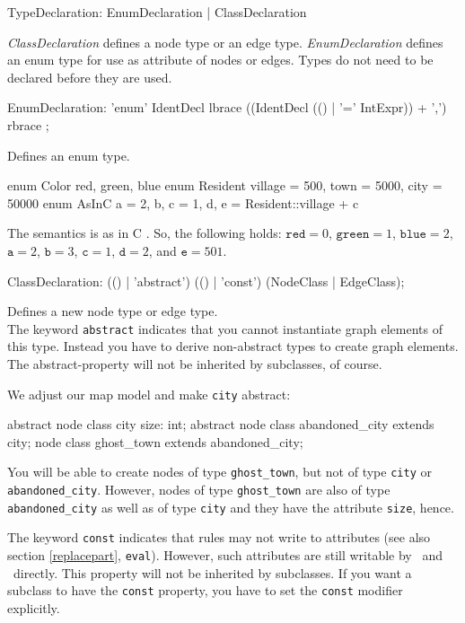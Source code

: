 \begin{rail}
  TypeDeclaration: EnumDeclaration | ClassDeclaration
\end{rail}
\emph{ClassDeclaration} defines a node type or an edge type. \emph{EnumDeclaration} defines an enum type for use as attribute of nodes or edges. Types do not need to be declared before they are used.

\begin{rail}
  EnumDeclaration: 'enum' IdentDecl lbrace ((IdentDecl (() | '=' IntExpr)) + ',') rbrace ;
\end{rail}
Defines an enum type.

\begin{example}
\begin{grgen}
enum Color {red, green, blue}
enum Resident {village = 500, town = 5000, city = 50000}
enum AsInC {a = 2, b, c = 1, d, e = Resident::village + c}
\end{grgen}
The semantics is as in C \cite{Sch:1990:ANSIC}. So, the following holds: $\texttt{red} = 0$, $\texttt{green} = 1$, $\texttt{blue} = 2$, $\texttt{a}=2$, $\texttt{b}=3$, $\texttt{c}=1$, $\texttt{d}=2$, and $\texttt{e}=501$.
\end{example}

\begin{rail}  
  ClassDeclaration: (() | 'abstract') (() | 'const') (NodeClass | EdgeClass);
\end{rail}
Defines a new node type or edge type.\\
The keyword \texttt{abstract} indicates that you cannot instantiate graph elements of this type. Instead you have to derive non-abstract types to create graph elements. The abstract-property will not be inherited by subclasses, of course.

\begin{example}
We adjust our map model and make \texttt{city} abstract:
\begin{grgen}
abstract node class city {
	size: int;
}
abstract node class abandoned_city extends city;
node class ghost_town extends abandoned_city;
\end{grgen}
You will be able to create nodes of type \texttt{ghost\_town}, but not of type \texttt{city} or \texttt{abandoned\_city}. However, nodes of type \texttt{ghost\_town} are also of type \texttt{abandoned\_city} as well as of type \texttt{city} and they have the attribute \texttt{size}, hence.
\end{example}
The keyword \texttt{const} indicates that rules may not write to attributes (see also section \ref{replacepart}, \texttt{eval}). However, such attributes are still writable by \LibGr\ and \GrShell\ directly. This property will not be inherited by subclasses. If you want a subclass to have the \texttt{const} property, you have to set the \texttt{const} modifier explicitly.

